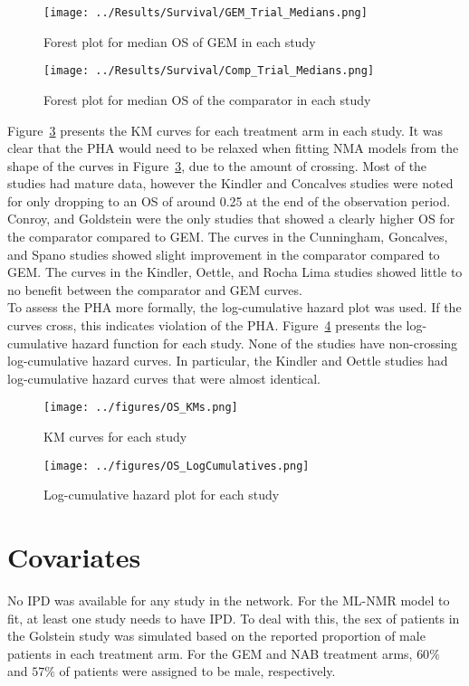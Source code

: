 \begin{figure}[h]
    \centering
    \texttt{[image: ../Results/Survival/GEM\_Trial\_Medians.png]} 
    \caption{Forest plot for median OS of GEM in each study}
    \label{fig:GEMMedForest}
\end{figure}

\begin{figure}[h]
    \centering
    \texttt{[image: ../Results/Survival/Comp\_Trial\_Medians.png]} 
    \caption{Forest plot for median OS of the comparator in each study}
    \label{fig:CompMedForest}
\end{figure}

Figure~\ref{fig:OSKMs} presents the KM curves for each treatment arm in each study. It was clear that the PHA would need to be relaxed when fitting NMA models from the shape of the curves in Figure~\ref{fig:OSKMs}, due to the amount of crossing. Most of the studies had mature data, however the Kindler and Concalves studies were noted for only dropping to an OS of around 0.25 at the end of the observation period. Conroy, and Goldstein were the only studies that showed a clearly higher OS for the comparator compared to GEM. The curves in the Cunningham, Goncalves, and Spano studies showed slight improvement in the comparator compared to GEM. The curves in the Kindler, Oettle, and Rocha Lima studies showed little to no benefit between the comparator and GEM curves. \\

To assess the PHA more formally, the log-cumulative hazard plot was used. If the curves cross, this indicates violation of the PHA. Figure~\ref{fig:OSLCs} presents the log-cumulative hazard function for each study. None of the studies have non-crossing log-cumulative hazard curves. In particular, the Kindler and Oettle studies had log-cumulative hazard curves that were almost identical. 

\begin{figure}[h]
    \centering
    \texttt{[image: ../figures/OS\_KMs.png]} 
    \caption{KM curves for each study}
    \label{fig:OSKMs}
\end{figure}

\begin{figure}[h]
    \centering
    \texttt{[image: ../figures/OS\_LogCumulatives.png]} 
    \caption{Log-cumulative hazard plot for each study}
    \label{fig:OSLCs}
\end{figure}

\section{Covariates}
No IPD was available for any study in the network. For the ML-NMR model to fit, at least one study needs to have IPD. To deal with this, the sex of patients in the Golstein study was simulated based on the reported proportion of male patients in each treatment arm. For the GEM and NAB treatment arms, $60\%$ and $57\%$ of patients were assigned to be male, respectively. 


